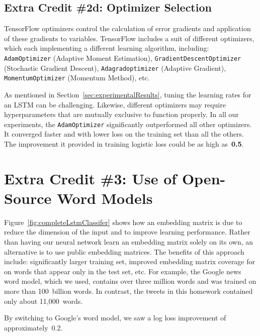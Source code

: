 \documentclass{report}
\begin{document}
     
  \subsection{Extra Credit \#2d: Optimizer Selection}
  
  TensorFlow optimizers control the calculation of error gradients and application of these gradients to variables.  TensorFlow includes a suit of different optimizers, which each implementing a different learning algorithm, including: \texttt{AdamOptimizer} (Adaptive Moment Estimation), \texttt{GradientDescentOptimizer} (Stochastic Gradient Descent), \texttt{Adagradoptimizer} (Adaptive Gradient), \texttt{MomentumOptimizer} (Momentum Method), etc.  
  
  As mentioned in Section~\ref{sec:experimentalResults}, tuning the learning rates for an LSTM can be challenging.  Likewise, different optimizers may require hyperparameters that are mutually exclusive to function properly.  In all our experiments, the \texttt{AdamOptimizer} significantly outperformed all other optimizers.  It converged faster and with lower loss on the training set than all the others.  The improvement it provided in training logistic loss could be as high as~\textbf{0.5}.  
  
  \section{Extra Credit \#3: Use of Open-Source Word Models}\label{sec:openSourceWordModels}
  
  Figure~\ref{fig:completeLstmClassifer} shows how an embedding matrix is due to reduce the dimension of the input and to improve learning performance.  Rather than having our neural network learn an embedding matrix solely on its own, an alternative is to use public embedding matrices.  The benefits of this approach include: significantly larger training set, improved embedding matrix coverage for on words that appear only in the test set, etc.  For example, the Google news word model, which we used, contains over three million words and was trained on more than 100~billion words.  In contrast, the tweets in this homework contained only about 11,000~words.
  
  By switching to Google's word model, we saw a log loss improvement of approximately~0.2.
\end{document}
